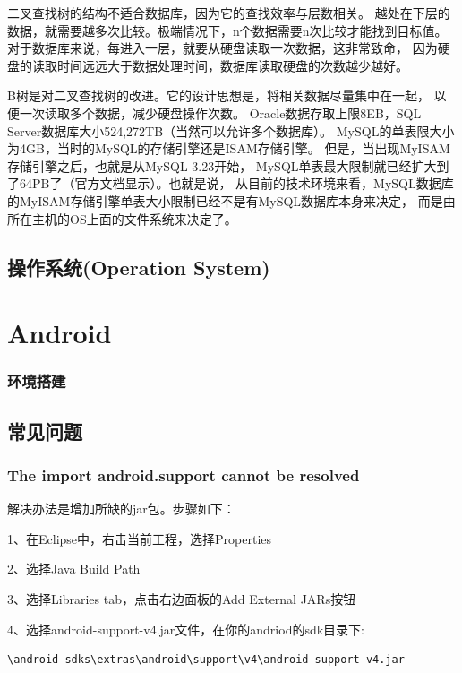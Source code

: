 \documentclass{book}
\begin{document}
二叉查找树的结构不适合数据库，因为它的查找效率与层数相关。
越处在下层的数据，就需要越多次比较。极端情况下，n个数据需要n次比较才能找到目标值。
对于数据库来说，每进入一层，就要从硬盘读取一次数据，这非常致命，
因为硬盘的读取时间远远大于数据处理时间，数据库读取硬盘的次数越少越好。

B树是对二叉查找树的改进。它的设计思想是，将相关数据尽量集中在一起，
以便一次读取多个数据，减少硬盘操作次数。
Oracle数据存取上限8EB，SQL Server数据库大小524,272TB（当然可以允许多个数据库）。
MySQL的单表限大小为4GB，当时的MySQL的存储引擎还是ISAM存储引擎。
但是，当出现MyISAM存储引擎之后，也就是从MySQL 3.23开始，
MySQL单表最大限制就已经扩大到了64PB了（官方文档显示）。也就是说，
从目前的技术环境来看，MySQL数据库的MyISAM存储引擎单表大小限制已经不是有MySQL数据库本身来决定，
而是由所在主机的OS上面的文件系统来决定了。

\section{操作系统(Operation System)}

\chapter{Android}

\subsection{环境搭建}


\section{常见问题}

\subsection{The import android.support cannot be resolved}

解决办法是增加所缺的jar包。步骤如下：

1、在Eclipse中，右击当前工程，选择Properties

2、选择Java Build Path

3、选择Libraries tab，点击右边面板的Add External JARs按钮

4、选择android-support-v4.jar文件，在你的andriod的sdk目录下: 

\begin{lstlisting}
\android-sdks\extras\android\support\v4\android-support-v4.jar
\end{lstlisting}
\end{document}
